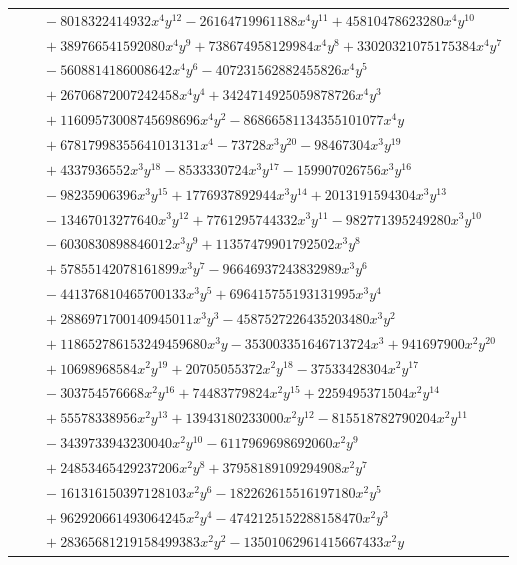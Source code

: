 \documentclass[11pt]{article}
\begin{document}
\begin{longtable}{@{}ll@{}}
 & $\quad -8018322414932x^{4}y^{12}-26164719961188x^{4}y^{11}+45810478623280x^{4}y^{10}$\\
 & $\quad +389766541592080x^{4}y^{9}+738674958129984x^{4}y^{8}+33020321075175384x^{4}y^{7}$\\
 & $\quad -5608814186008642x^{4}y^{6}-407231562882455826x^{4}y^{5}$\\
 & $\quad +26706872007242458x^{4}y^{4}+3424714925059878726x^{4}y^{3}$\\
 & $\quad +11609573008745698696x^{4}y^{2}-86866581134355101077x^{4}y$\\
 & $\quad +67817998355641013131x^{4}-73728x^{3}y^{20}-98467304x^{3}y^{19}$\\
 & $\quad +4337936552x^{3}y^{18}-8533330724x^{3}y^{17}-159907026756x^{3}y^{16}$\\
 & $\quad -98235906396x^{3}y^{15}+1776937892944x^{3}y^{14}+2013191594304x^{3}y^{13}$\\
 & $\quad -13467013277640x^{3}y^{12}+7761295744332x^{3}y^{11}-982771395249280x^{3}y^{10}$\\
 & $\quad -6030830898846012x^{3}y^{9}+11357479901792502x^{3}y^{8}$\\
 & $\quad +57855142078161899x^{3}y^{7}-96646937243832989x^{3}y^{6}$\\
 & $\quad -441376810465700133x^{3}y^{5}+696415755193131995x^{3}y^{4}$\\
 & $\quad +2886971700140945011x^{3}y^{3}-4587527226435203480x^{3}y^{2}$\\
 & $\quad +118652786153249459680x^{3}y-353003351646713724x^{3}+941697900x^{2}y^{20}$\\
 & $\quad +10698968584x^{2}y^{19}+20705055372x^{2}y^{18}-37533428304x^{2}y^{17}$\\
 & $\quad -303754576668x^{2}y^{16}+74483779824x^{2}y^{15}+2259495371504x^{2}y^{14}$\\
 & $\quad +55578338956x^{2}y^{13}+13943180233000x^{2}y^{12}-815518782790204x^{2}y^{11}$\\
 & $\quad -3439733943230040x^{2}y^{10}-6117969698692060x^{2}y^{9}$\\
 & $\quad +24853465429237206x^{2}y^{8}+37958189109294908x^{2}y^{7}$\\
 & $\quad -161316150397128103x^{2}y^{6}-182262615516197180x^{2}y^{5}$\\
 & $\quad +962920661493064245x^{2}y^{4}-4742125152288158470x^{2}y^{3}$\\
 & $\quad +28365681219158499383x^{2}y^{2}-13501062961415667433x^{2}y$\\

\end{longtable}
\end{document}
